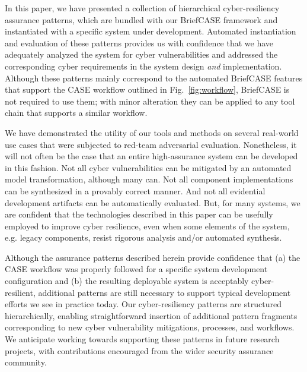 
In this paper, we have presented a collection of hierarchical cyber-resiliency assurance patterns, which are bundled with our BriefCASE framework and instantiated with a specific system under development.  Automated instantiation and evaluation of these patterns provides us with confidence that we have adequately analyzed the system for cyber vulnerabilities and addressed the corresponding cyber requirements in the system design \textit{and} implementation.
Although these patterns mainly correspond to the automated BriefCASE features that support the CASE workflow outlined in Fig.~\ref{fig:workflow}, BriefCASE is not required to use them; with minor alteration they can be applied to any tool chain that supports a similar workflow.

We have demonstrated the utility of our tools and methods on several real-world use cases that were subjected to red-team adversarial evaluation.  Nonetheless, it will not often be the case that an entire high-assurance system can be developed in this fashion.  Not all cyber vulnerabilities can be mitigated by an automated model transformation, although many can.  Not all component implementations can be synthesized in a provably correct manner.  And not all evidential development artifacts can be automatically evaluated.  But, for many systems, we are confident that the technologies described in this paper can be usefully employed to improve cyber resilience, even when some elements of the system, e.g. legacy components, resist rigorous analysis and/or automated synthesis.
%

Although the assurance patterns described herein provide confidence that (a) the CASE workflow was properly followed for a specific system development configuration and (b) the resulting deployable system is acceptably cyber-resilient, additional patterns are still necessary to support typical development efforts we see in practice today.  
%
Our cyber-resiliency patterns are structured hierarchically, enabling straightforward insertion of additional pattern fragments corresponding to new cyber vulnerability mitigations, processes, and workflows. 
We anticipate working towards supporting these patterns in future research projects, with contributions encouraged from the wider security assurance community.